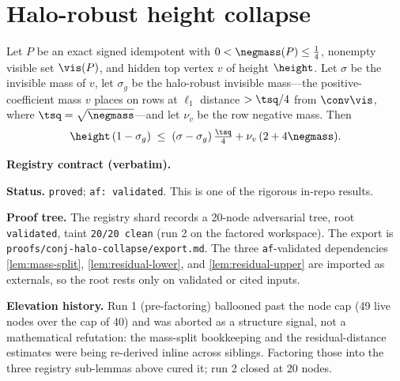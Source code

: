 \section{Halo-robust height collapse}\label{sec:halo-collapse}

\begin{lemma}\label{lem:halo-collapse}
Let $P$ be an exact signed idempotent with $0<\negmass(P)\le\tfrac14$, nonempty
visible set $\vis(P)$, and hidden top vertex $v$ of height $\height$. Let
$\sigma$ be the invisible mass of $v$, let $\sigma_g$ be the halo-robust
invisible mass---the positive-coefficient mass $v$ places on rows at $\ell_1$
distance $>\tsq/4$ from $\conv\vis$, where $\tsq=\sqrt{\negmass}$---and let
$\nu_v$ be the row negative mass. Then
\[
  \height\,(1-\sigma_g)\;\le\;(\sigma-\sigma_g)\,\tfrac{\tsq}{4}
    +\nu_v\,(2+4\negmass).
\]
\end{lemma}

\noindent\textbf{Registry contract (verbatim).}

\noindent\textbf{Status.} \texttt{proved}; \texttt{af: validated}.
This is one of the rigorous in-repo results.

\noindent\textbf{Proof tree.} The registry shard records a 20-node
adversarial tree, root \texttt{validated}, taint \texttt{20/20 clean}
(run 2 on the factored workspace).  The export is
\texttt{proofs/conj-halo-collapse/export.md}.  The three
\texttt{af}-validated dependencies \ref{lem:mass-split},
\ref{lem:residual-lower}, and \ref{lem:residual-upper} are imported as
externals, so the root rests only on validated or cited inputs.

\noindent\textbf{Elevation history.} Run 1 (pre-factoring) ballooned
past the node cap (49 live nodes over the cap of 40) and was aborted as
a structure signal, not a mathematical refutation: the mass-split
bookkeeping and the residual-distance estimates were being re-derived
inline across siblings.  Factoring those into the three registry
sub-lemmas above cured it; run 2 closed at 20 nodes.

